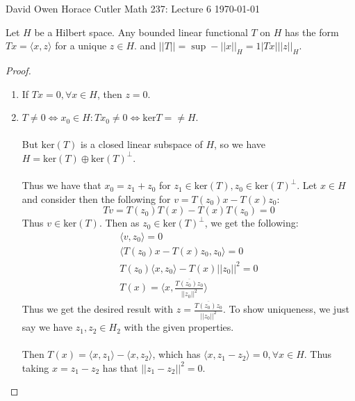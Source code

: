 \documentclass[12pt]{article}
\newenvironment{theorem}[2][Theorem]{\begin{trivlist}
\item[\hskip \labelsep {\bfseries #1}\hskip \labelsep {\bfseries #2.}]}{\end{trivlist}}
\begin{document}
\noindent David Owen Horace Cutler \hfill {\Large Math 237: Lecture 6} \hfill \today

\begin{theorem}{(Riesz Representation Theorem for Hilbert Space)}
    Let $H$ be a Hilbert space. Any bounded linear functional $T$ on $H$ has the form $Tx = \langle x, z \rangle$ for a unique $z \in H$. and $||T|| = \sup-{||x||_H = 1} |Tx| ||z||_H$. 
    \begin{proof}
        \begin{enumerate}
            \item If $Tx = 0, \forall x \in H$, then $z = 0$.
            \item $T \neq 0 \Leftrightarrow x_0 \in H : Tx_0 \neq 0 \Leftrightarrow \text{ker}T = \neq H$. \\ \\
            But $\text{ker}(T)$ is a closed linear subspace of $H$, so we have $H = \text{ker}(T) \oplus \text{ker}(T)^\perp$. \\ \\
            Thus we have that $x_0 = z_1 + z_0$ for $z_1 \in \text{ker}(T), z_0 \in \text{ker}(T)^\perp$. Let $x \in H$ and consider then the following for $v = T(z_0)x - T(x)z_0$:
            \begin{equation}
                Tv = T(z_0)T(x) - T(x)T(z_0) = 0
            \end{equation}
            Thus $v \in \text{ker}(T)$. Then as $z_0 \in \text{ker}(T)^\perp$, we get the following:
            \begin{equation}
                \begin{aligned}
                    \langle v, z_0 \rangle = 0 \\
                    \langle T(z_0)x - T(x)z_0, z_0 \rangle = 0 \\
                    T(z_0)\langle x, z_0 \rangle - T(x)||z_0||^2 = 0 \\
                    T(x) = \langle x , \frac{\overline{T(z_0)z_0}}{||z_0||^2} \rangle
                \end{aligned}
            \end{equation}
            Thus we get the desired result with $z = \frac{\overline{T(z_0)z_0}}{||z_0||^2}$. To show uniqueness, we just say we have $z_1, z_2 \in H_2$ with the given properties. \\ \\
            Then $T(x) = \langle x, z_1 \rangle - \langle x, z_2 \rangle$, which has $\langle x, z_1 - z_2 \rangle = 0, \forall x \in H$. Thus taking $x = z_1 - z_2$ has that $||z_1 - z_2||^2 = 0$.
        \end{enumerate}
    \end{proof}
\end{theorem}
\end{document}
